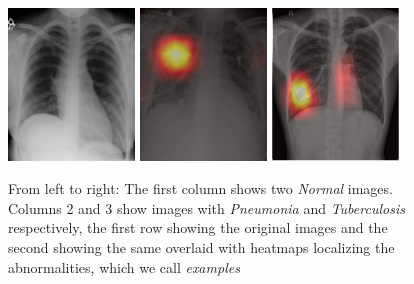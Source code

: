 \documentclass[8pt]{beamer}
\begin{document}
\begin{frame}
\begin{columns}
\begin{figure}
      \includegraphics[width=0.3\textwidth]{images/normal2}\hspace{0.01\textwidth}%
      \includegraphics[width=0.3\textwidth]{images/consolidation_heatmap}\hspace{0.01\textwidth}%
      \includegraphics[width=0.3\textwidth]{images/TB_heatmap}
      \caption{From left to right: The first column shows two \emph{Normal}
        images. Columns 2 and 3 show images with \emph{Pneumonia} and
        \emph{Tuberculosis} respectively, the first row showing the original
        images and the second showing the same overlaid with heatmaps localizing
        the abnormalities, which we call \emph{examples}}
      \label{basic_examples}
    \end{figure}

  \end{columns}
\end{frame}
\end{document}
